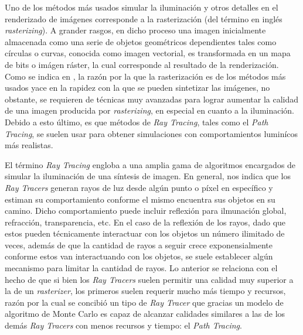 \documentclass[conference]{IEEEtran}
\begin{document}
Uno de los métodos más usados simular la iluminación y otros detalles en el renderizado de imágenes corresponde a la rasterización (del término en inglés \textit{rasterizing}). A grander rasgos, en dicho proceso una imagen inicialmente almacenada como una serie de objetos geométricos dependientes tales como círculas o curvas, conocida como imagen vectorial, es transformada en un mapa de bits o imágen ráster, la cual corresponde al resultado de la renderización. Como se indica en \cite{b1}, la razón por la que la rasterización es de los métodos más usados yace en la rapidez con la que se pueden sintetizar las imágenes, no obstante, se requieren de técnicas muy avanzadas para lograr aumentar la calidad de una imagen producida por \textit{rasterizing}, en especial en cuanto a la iluminación. Debido a esto último, es que métodos de \textit{Ray Tracing}, tales como el \textit{Path Tracing}, se suelen usar para obtener simulaciones con comportamientos luminícos más realistas. 

El término \textit{Ray Tracing} engloba a una amplia gama de algoritmos encargados de simular la iluminación de una síntesis de imagen. En general, \cite{b1} nos indica que los \textit{Ray Tracers} generan rayos de luz desde algún punto o píxel en específico y estiman su comportamiento conforme el mismo encuentra sus objetos en su camino. Dicho comportamiento puede incluir reflexión para ilmunación global, refracción, transparencia, etc. En el caso de la reflexión de los rayos, dado que estos pueden técnicamente interactuar con los objetos un número ilimitado de veces, además de que la cantidad de rayos a seguir crece exponensialmente conforme estos van interactuando con los objetos, se suele establecer algún mecanismo para limitar la cantidad de rayos. Lo anterior se relaciona con el hecho de que si bien los \textit{Ray Tracers} suelen permitir una calidad muy superior a la de un \textit{rasterizer}, los primeros suelen requerir mucho más tiempo y recursos, razón por la cual se concibió un tipo de \textit{Ray Tracer} que gracias un modelo de algoritmo de Monte Carlo es capaz de alcanzar calidades similares a las de los demás \textit{Ray Tracers} con menos recursos y tiempo: el \textit{Path Tracing}.
\end{document}
